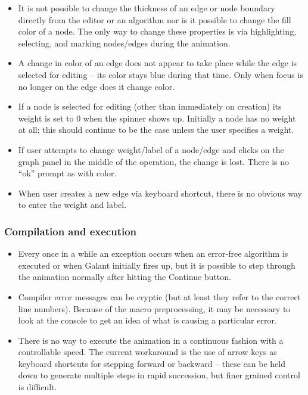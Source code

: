 \begin{itemize}

\item
It is not possible to change the thickness of an edge or node boundary directly
from the editor or an algorithm nor is it possible to change the fill color of a node.
The only way to change these properties is via highlighting, selecting, and
marking nodes/edges during the animation.

\item
A change in color of an edge does not appear to take place while the edge
is selected for editing -- its color stays blue during that time.
Only when focus is no longer on the edge does it change color.

\item If a node is selected for editing (other than immediately on creation)
  its weight is set to 0 when the spinner shows up.  Initially a node has no
  weight at all; this should continue to be the case unless the user
  specifies a weight.

\item If user attempts to change weight/label of a node/edge and clicks on
  the graph panel in the middle of the operation, the change is lost. There
  is no ``ok'' prompt as with color.

\item When user creates a new edge via keyboard shortcut, there is no obvious
  way to enter the weight and label.

\end{itemize}

\subsubsection*{Compilation and execution}

\begin{itemize}

\item Every once in a while an exception occurs when an error-free algorithm
  is executed or when Galant initially fires up, but it is possible to step
  through the animation normally after hitting the \textsf{Continue} button.

\item
  Compiler error messages can be cryptic (but at least they refer to the correct
  line numbers). Because of the macro preprocessing, it may be necessary to look at the console to get an idea of what is causing a particular error.
  
\item
  There is no way to execute the animation in a continuous fashion with a
  controllable speed. The current workaround is the use of arrow keys as keyboard
  shortcuts for stepping forward or backward -- these can be held down to
  generate multiple steps in rapid succession, but finer grained control is
  difficult.

\end{itemize}

